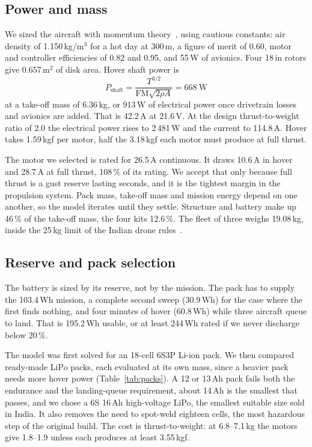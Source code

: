 \documentclass[conference]{IEEEtran}
\begin{document}
\subsection{Power and mass}

We sized the aircraft with momentum theory~\cite{leishman2006helicopter}, using
cautious constants: air density of 1.150\,kg/m$^3$ for a hot day at 300\,m, a
figure of merit of 0.60, motor and controller efficiencies of 0.82 and 0.95,
and 55\,W of avionics. Four 18\,in rotors give 0.657\,m$^2$ of disk area. Hover
shaft power is
\begin{equation}
P_{\text{shaft}} = \frac{T^{3/2}}{\mathrm{FM}\sqrt{2\rho A}} = 668~\text{W}
\end{equation}
at a take-off mass of 6.36\,kg, or 913\,W of electrical power once drivetrain
losses and avionics are added. That is 42.2\,A at 21.6\,V. At the design
thrust-to-weight ratio of 2.0 the electrical power rises to 2\,481\,W and the
current to 114.8\,A. Hover takes 1.59\,kgf per motor, half the 3.18\,kgf each
motor must produce at full thrust.

The motor we selected is rated for 26.5\,A continuous. It draws 10.6\,A in
hover and 28.7\,A at full thrust, 108\,\% of its rating. We accept that only
because full thrust is a gust reserve lasting seconds, and it is the tightest
margin in the propulsion system. Pack mass, take-off mass and mission energy
depend on one another, so the model iterates until they settle. Structure and
battery make up 46\,\% of the take-off mass, the four kits 12.6\,\%. The fleet
of three weighs 19.08\,kg, inside the 25\,kg limit of the Indian drone
rules~\cite{dronerules2021}.

\subsection{Reserve and pack selection}

The battery is sized by its reserve, not by the mission. The pack has to supply
the 103.4\,Wh mission, a complete second sweep (30.9\,Wh) for the case where
the first finds nothing, and four minutes of hover (60.8\,Wh) while three
aircraft queue to land. That is 195.2\,Wh usable, or at least 244\,Wh rated if
we never discharge below 20\,\%.

The model was first solved for an 18-cell 6S3P Li-ion pack. We then compared
ready-made LiPo packs, each evaluated at its own mass, since a heavier pack
needs more hover power (Table~\ref{tab:packs}). A 12 or 13\,Ah pack fails both
the endurance and the landing-queue requirement, about 14\,Ah is the smallest
that passes, and we chose a 6S 16\,Ah high-voltage LiPo, the smallest suitable
size sold in India. It also removes the need to spot-weld eighteen cells, the
most hazardous step of the original build. The cost is thrust-to-weight: at
6.8--7.1\,kg the motors give 1.8--1.9 unless each produces at least 3.55\,kgf.
\end{document}
